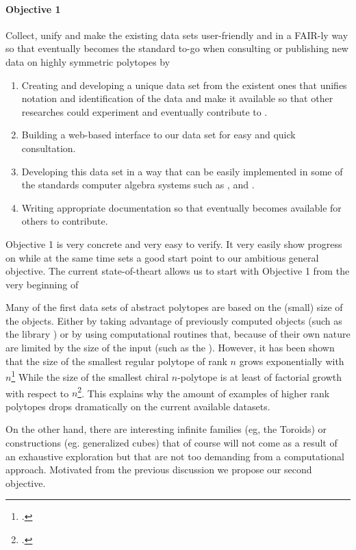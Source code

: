 \paragraph{Objective 1} Collect, unify and make the existing data sets user-friendly and in a FAIR-ly way so that \ourp eventually becomes the standard to-go when consulting or publishing new data on highly symmetric polytopes by
\begin{enumerate}[label=\textit{(\roman*)}, noitemsep]
 \item Creating and developing a unique data set from the existent ones that unifies notation and identification of the data and make it available so that other researches could experiment and eventually contribute to \ourp.
\item Building a web-based interface to our data set for easy and quick consultation.
 \item Developing this data set in a way that can be easily implemented in some of the standards computer algebra systems such as \magma, \gap and \sage.
	\item Writing appropriate documentation so that \ourp eventually becomes available for others to contribute.
\end{enumerate}

Objective 1 is very concrete and very easy to verify. It very easily show progress on \ourp while at the same time sets a good start point to our ambitious general objective.
The current state-of-theart allows us to start with Objective 1 from the very beginning of \ourp

Many of the first data sets of abstract polytopes are based on the (small) size of the objects.
Either by taking advantage of previously computed objects (such as the library \smallgrp) or by using computational routines that, because of their own nature are limited by the size of the input (such as the \lins).
However, it has been shown that the size of the smallest regular polytope of rank $n$ grows exponentially with $n$\footcite{Conder_2013_SmallestRegularPolytopes} While the size of the smallest chiral $n$-polytope is at least of factorial growth with respect to $n$\footcite{Cunningham_2017_NonFlatRegular}.
This explains why the amount of examples of higher rank polytopes drops dramatically on the current available datasets.

On the other hand, there are interesting infinite families (eg, the Toroids\cite{}) or constructions (eg. generalized cubes) that of course will not come as a result of an exhaustive exploration but that are not too demanding from a computational approach. Motivated from the previous discussion we propose our second objective.

